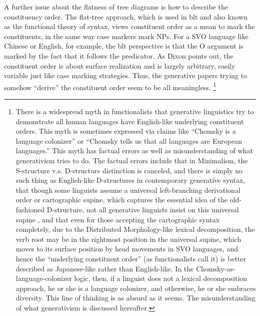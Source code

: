 \documentclass[../main.tex]{subfiles}
\begin{document}
A further issue about the flatness of tree diagrams is how to describe the constituency order.
The flat-tree approach, which is used in \ac{blt} and also known as the functional theory of syntax,
views constituent order as a mean to mark the constituents,
in the same way case markers mark NPs.
For a SVO language like Chinese or English, for example, 
the \ac{blt} perspective is that the O argument is marked by 
the fact that it follows the predicator.
As Dixon points out, the constituent order is about surface realization and is largely arbitrary,
easily variable just like case marking strategies.
Thus, the generative papers trying to somehow ``derive'' the constituent order
seem to be all meaningless.%
\footnote{
    There is a widespread myth in functionalists that 
    generative linguistics try to demonstrate 
    all human languages have English-like underlying constituent orders.
    This myth is sometimes expressed via claims like 
    ``Chomsky is a language colonizer'' or 
    ``Chomsky tells us that all languages are European languages.''
    This myth has factual errors as well as misunderstanding of what generativism tries to do.
    The factual errors include 
    that in Minimalism, the S-structure v.s. D-structure distinction is canceled,
    and there is simply no such thing as English-like D-structures in contemporary generative syntax,
    that though some linguists assume a universal left-branching derivational order 
    or cartographic supine,
    which captures the essential idea of the old-fashioned D-structure,
    not all generative linguists insist on this universal supine \citep{wiltschko2014universal},
    and that even for those accepting the cartographic syntax completely,
    due to the Distributed Morphology-like lexical decomposition,
    the verb root may be in the rightmost position in the universal supine,
    which moves to its surface position by head movements in SVO languages,
    and hence the ``underlying constituent order'' (as functionalists call it)
    is better described as Japanese-like rather than English-like.
    In the Chomsky-as-language-colonizer logic, then,
    if a linguist does not a lexical decomposition approach, he or she is a language colonizer,
    and otherwise, he or she embraces diversity.
    This line of thinking is as absurd as it seems.
    The misunderstanding of what generativism is discussed hereafter.
}
\end{document}

